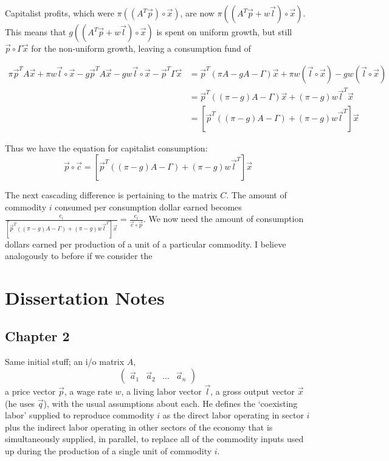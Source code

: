 \documentclass{article}
\theoremstyle{definition}
\begin{document}
Capitalist profits, which were $\pi((A^T\vec{p})\circ \vec{x})$, are now $\pi((A^T\vec{p}+w\vec{l})\circ \vec{x})$. This means that $g((A^T\vec{p}+w\vec{l})\circ \vec{x})$ is spent on uniform growth, but still $\vec{p}\circ \Gamma\vec{x}$ for the non-uniform growth, leaving a consumption fund of 

\begin{align}
    \pi\vec{p}^TA\vec{x}+\pi w\vec{l}\circ \vec{x}-g\vec{p}^TA\vec{x}-gw\vec{l}\circ \vec{x} -\vec{p}^T\Gamma \vec{x} &= \vec{p}^T(\pi A - gA - \Gamma)\vec{x}+\pi w(\vec{l}\circ \vec{x})-gw(\vec{l}\circ \vec{x}) \\
    &= \vec{p}^T((\pi-g)A-\Gamma)\vec{x} + (\pi-g)w\vec{l}^T\vec{x} \\
    &= [\vec{p}^T((\pi-g)A-\Gamma) + (\pi-g)w\vec{l}^T]\vec{x}
\end{align}

Thus we have the equation for capitalist consumption:
\begin{equation}
    \vec{p}\circ \vec{c} = [\vec{p}^T((\pi-g)A-\Gamma) + (\pi-g)w\vec{l}^T]\vec{x}
\end{equation}

The next cascading difference is pertaining to the matrix $C$. The amount of commodity $i$ consumed per consumption dollar earned becomes $\frac{c_i}{[\vec{p}^T((\pi-g)A-\Gamma) + (\pi-g)w\vec{l}^T] \vec{x}} = \frac{c_i}{\vec{c}\circ \vec{p}}$. We now need the amount of consumption dollars earned per production of a unit of a particular commodity. I believe analogously to before if we consider the 

\section{Dissertation Notes}

\subsection{Chapter 2}
Same initial stuff; an i/o matrix $A$,
\[
\begin{pmatrix}
    \vec{a}_1 & \vec{a}_2 & \ldots & \vec{a}_n   
\end{pmatrix}
\]
a price vector $\vec{p}$, a wage rate $w$, a living labor vector $\vec{l}$, a gross output vector $\vec{x}$ (he uses $\vec{q}$), with the usual assumptions about each. He defines the `coexisting labor' supplied to reproduce commodity $i$ as the direct labor operating in sector $i$ plus the indirect labor operating in other sectors of the economy that is simultaneously supplied, in parallel, to replace all of the commodity inputs used up during the production of a single unit of commodity $i$. 
\end{document}
